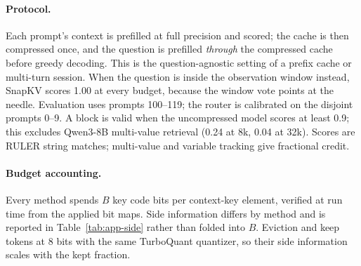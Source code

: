 \paragraph{Protocol.}
Each prompt's context is prefilled at full precision and scored; the cache is
then compressed once, and the question is prefilled \emph{through} the
compressed cache before greedy decoding.  This is the question-agnostic setting
of a prefix cache or multi-turn session.  When the question is inside the
observation window instead, SnapKV scores 1.00 at every budget, because the
window vote points at the needle.  Evaluation uses prompts 100--119; the
\sieve{} router is calibrated on the disjoint prompts 0--9.  A block is valid
when the uncompressed model scores at least 0.9; this excludes Qwen3-8B
multi-value retrieval (0.24 at 8k, 0.04 at 32k).  Scores are RULER string
matches; multi-value and variable tracking give fractional credit.

\paragraph{Budget accounting.}
Every method spends $B$ key code bits per context-key element, verified at run
time from the applied bit maps.  Side information differs by method and is
reported in Table~\ref{tab:app-side} rather than folded into $B$.  Eviction and
\sieve{} keep tokens at 8 bits with the same TurboQuant quantizer, so their
side information scales with the kept fraction.

